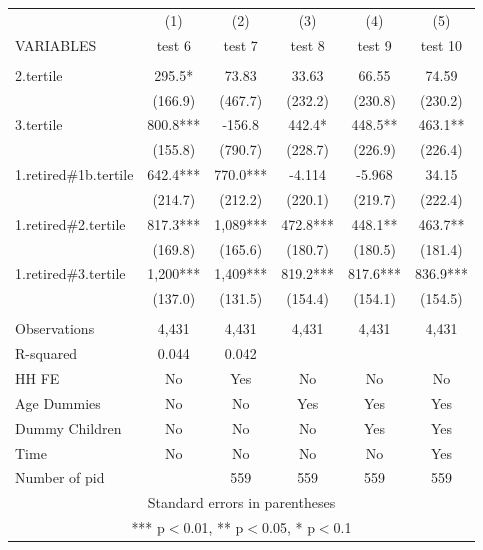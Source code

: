 \begin{tabular}{lccccc} \hline
 & (1) & (2) & (3) & (4) & (5) \\
VARIABLES & test 6 & test 7 & test 8 & test 9 & test 10 \\ \hline
 &  &  &  &  &  \\
2.tertile & 295.5* & 73.83 & 33.63 & 66.55 & 74.59 \\
 & (166.9) & (467.7) & (232.2) & (230.8) & (230.2) \\
3.tertile & 800.8*** & -156.8 & 442.4* & 448.5** & 463.1** \\
 & (155.8) & (790.7) & (228.7) & (226.9) & (226.4) \\
1.retired\#1b.tertile & 642.4*** & 770.0*** & -4.114 & -5.968 & 34.15 \\
 & (214.7) & (212.2) & (220.1) & (219.7) & (222.4) \\
1.retired\#2.tertile & 817.3*** & 1,089*** & 472.8*** & 448.1** & 463.7** \\
 & (169.8) & (165.6) & (180.7) & (180.5) & (181.4) \\
1.retired\#3.tertile & 1,200*** & 1,409*** & 819.2*** & 817.6*** & 836.9*** \\
 & (137.0) & (131.5) & (154.4) & (154.1) & (154.5) \\
 &  &  &  &  &  \\
Observations & 4,431 & 4,431 & 4,431 & 4,431 & 4,431 \\
R-squared & 0.044 & 0.042 &  &  &  \\
HH FE & No & Yes & No & No & No \\
Age Dummies & No & No & Yes & Yes & Yes \\
Dummy Children & No & No & No & Yes & Yes \\
Time & No & No & No & No & Yes \\
 Number of pid &  & 559 & 559 & 559 & 559 \\ \hline
\multicolumn{6}{c}{ Standard errors in parentheses} \\
\multicolumn{6}{c}{ *** p$<$0.01, ** p$<$0.05, * p$<$0.1} \\
\end{tabular}
